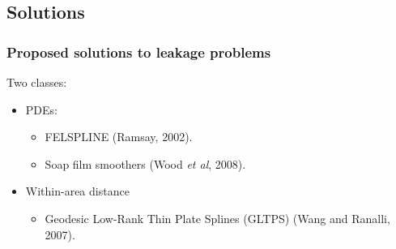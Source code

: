 \documentclass[ignorenonframetext]{beamer} %
\newcommand{\bc}{\begin{center}}
\newcommand{\ec}{\end{center}}
\newcommand{\bi}{\begin{itemize}}
\newcommand{\ei}{\end{itemize}}
\begin{document}

\subsection{Solutions}






\begin{frame}
	\frametitle{Proposed solutions to leakage problems}
	Two classes:
       \bi
         \item PDEs:
	  \bi
             \item FELSPLINE (Ramsay, 2002).
             \item Soap film smoothers (Wood \emph{et al}, 2008).
           \ei
           \item Within-area distance
           \bi
             \item Geodesic Low-Rank  Thin Plate Splines (GLTPS) (Wang and Ranalli, 2007).
           \ei
        \ei
\end{frame}
\end{document}
